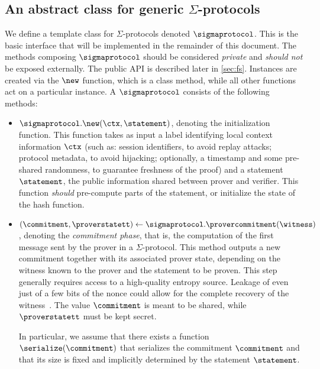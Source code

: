 \documentclass[11pt]{article}
\begin{document}
\subsection{An abstract class for generic $\Sigma$-protocols}
We define a template class for $\Sigma$-protocols denoted $\sigmaprotocol$. This is the basic interface that will be implemented in the remainder of this document.
The methods composing $\sigmaprotocol$ should be considered \emph{private} and \emph{should not} be exposed externally. The public API is described later in \cref{sec:fs}.
Instances are created via the $\new$ function, which is a class method, while all other functions act on a particular instance.
A $\sigmaprotocol$ consists of the following methods:
      \begin{itemize}
        \item $\sigmaprotocol.\new(\ctx, \statement)$,
        denoting the initialization function. This function takes as input a label identifying local context information $\ctx$ (such as: session identifiers, to avoid replay attacks; protocol metadata, to avoid hijacking; optionally, a timestamp and some pre-shared randomness, to guarantee freshness of the proof) and a statement $\statement$,  the public information shared between prover and verifier.
        This function \emph{should} pre-compute parts of the statement, or initialize the state of the hash function.
        \item
          $(\commitment, \proverstatett)\gets \sigmaprotocol.\provercommitment(\witness)$,
          denoting the \emph{commitment phase}, that is, the computation of the first message sent by the prover in a $\Sigma$-protocol. This method outputs a new commitment together with its associated prover state, depending on the witness known to the prover and the statement to be proven.
          This step generally requires access to a high-quality entropy source.
          Leakage of even just of a few bits of the nonce could allow for the complete recovery of the witness~\cite{lattice-attack,bleichenbacher,CCS:ANTTY20}.
					The value $\commitment$ is meant to be shared, while $\proverstatett$ must be kept secret.

          In particular, we assume that there exists a function $\serialize(\commitment)$ that serializes the commitment $\commitment$ and that its size is fixed and implicitly determined by the statement $\statement$.


\end{itemize}
\end{document}
